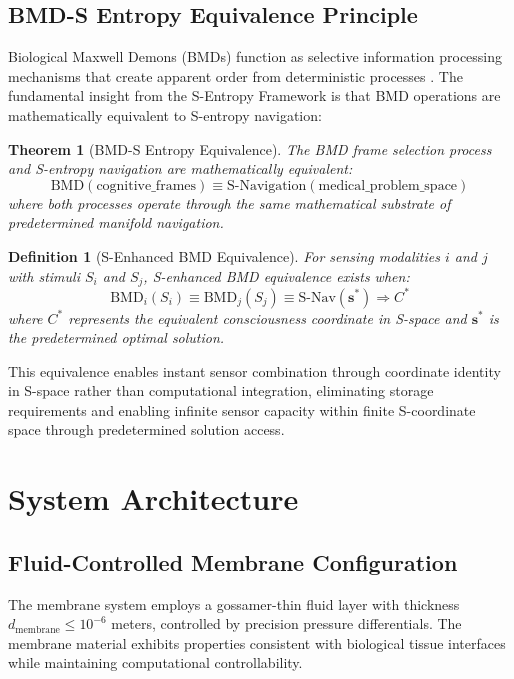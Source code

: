 \documentclass[12pt,a4paper]{article}
\newtheorem{theorem}{Theorem}
\newtheorem{definition}{Definition}
\begin{document}
\subsection{BMD-S Entropy Equivalence Principle}

Biological Maxwell Demons (BMDs) function as selective information processing mechanisms that create apparent order from deterministic processes \cite{mizraji2021}. The fundamental insight from the S-Entropy Framework is that BMD operations are mathematically equivalent to S-entropy navigation:

\begin{theorem}[BMD-S Entropy Equivalence]
The BMD frame selection process and S-entropy navigation are mathematically equivalent:
\begin{equation}
\text{BMD}(\text{cognitive\_frames}) \equiv \text{S-Navigation}(\text{medical\_problem\_space})
\end{equation}
where both processes operate through the same mathematical substrate of predetermined manifold navigation.
\end{theorem}

\begin{definition}[S-Enhanced BMD Equivalence]
For sensing modalities $i$ and $j$ with stimuli $S_i$ and $S_j$, S-enhanced BMD equivalence exists when:
\begin{equation}
\text{BMD}_i(S_i) \equiv \text{BMD}_j(S_j) \equiv \text{S-Nav}(\mathbf{s}^*) \Rightarrow C^*
\end{equation}
where $C^*$ represents the equivalent consciousness coordinate in S-space and $\mathbf{s}^*$ is the predetermined optimal solution.
\end{definition}

This equivalence enables instant sensor combination through coordinate identity in S-space rather than computational integration, eliminating storage requirements and enabling infinite sensor capacity within finite S-coordinate space through predetermined solution access.

\section{System Architecture}

\subsection{Fluid-Controlled Membrane Configuration}

The membrane system employs a gossamer-thin fluid layer with thickness $d_{\text{membrane}} \leq 10^{-6}$ meters, controlled by precision pressure differentials. The membrane material exhibits properties consistent with biological tissue interfaces while maintaining computational controllability.
\end{document}
